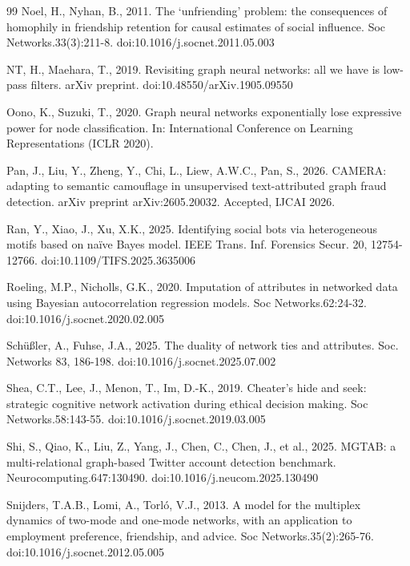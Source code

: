 \documentclass[onecolumn,pdflatex,sn-basic,Numbered]{sn-jnl}
\theoremstyle{thmstyleone}
\theoremstyle{thmstylethree}
\begin{document}
\begin{thebibliography}{99}
Noel, H., Nyhan, B., 2011. The `unfriending' problem: the consequences of homophily in friendship retention for causal estimates of social influence. Soc Networks.33(3):211-8. doi:10.1016/j.socnet.2011.05.003

NT, H., Maehara, T., 2019. Revisiting graph neural networks: all we have is low-pass filters. arXiv preprint. doi:10.48550/arXiv.1905.09550

Oono, K., Suzuki, T., 2020. Graph neural networks exponentially lose expressive power for node classification. In: International Conference on Learning Representations (ICLR 2020).

Pan, J., Liu, Y., Zheng, Y., Chi, L., Liew, A.W.C., Pan, S., 2026. CAMERA: adapting to semantic camouflage in unsupervised text-attributed graph fraud detection. arXiv preprint arXiv:2605.20032. Accepted, IJCAI 2026.

Ran, Y., Xiao, J., Xu, X.K., 2025. Identifying social bots via heterogeneous motifs based on na\"ive Bayes model. IEEE Trans. Inf. Forensics Secur. 20, 12754-12766. doi:10.1109/TIFS.2025.3635006

Roeling, M.P., Nicholls, G.K., 2020. Imputation of attributes in networked data using Bayesian autocorrelation regression models. Soc Networks.62:24-32. doi:10.1016/j.socnet.2020.02.005

Sch\"u{\ss}ler, A., Fuhse, J.A., 2025. The duality of network ties and attributes. Soc. Networks 83, 186-198. doi:10.1016/j.socnet.2025.07.002

Shea, C.T., Lee, J., Menon, T., Im, D.-K., 2019. Cheater's hide and seek: strategic cognitive network activation during ethical decision making. Soc Networks.58:143-55. doi:10.1016/j.socnet.2019.03.005

Shi, S., Qiao, K., Liu, Z., Yang, J., Chen, C., Chen, J., et al., 2025. MGTAB: a multi-relational graph-based Twitter account detection benchmark. Neurocomputing.647:130490. doi:10.1016/j.neucom.2025.130490

Snijders, T.A.B., Lomi, A., Torl\'o, V.J., 2013. A model for the multiplex dynamics of two-mode and one-mode networks, with an application to employment preference, friendship, and advice. Soc Networks.35(2):265-76. doi:10.1016/j.socnet.2012.05.005


\end{thebibliography}
\end{document}
